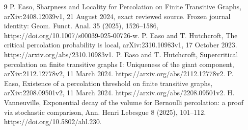 \documentclass[10pt]{article}
\begin{document}
9 P. Easo, Sharpness and Locality for Percolation on Finite Transitive Graphs, arXiv:2408.12039v1, 21 August 2024, exact reviewed source. Frozen journal identity: Geom. Funct. Anal. 35 (2025), 1526–1586, https://doi.org/10.1007/s00039-025-00726-w. P. Easo and T. Hutchcroft, The critical percolation probability is local, arXiv:2310.10983v1, 17 October 2023. https://arxiv.org/abs/2310.10983v1. P. Easo and T. Hutchcroft, Supercritical percolation on finite transitive graphs I: Uniqueness of the giant component, arXiv:2112.12778v2, 11 March 2024. https://arxiv.org/abs/2112.12778v2. P. Easo, Existence of a percolation threshold on finite transitive graphs, arXiv:2208.09501v2, 11 March 2024. https://arxiv.org/abs/2208.09501v2. H. Vanneuville, Exponential decay of the volume for Bernoulli percolation: a proof via stochastic comparison, Ann. Henri Lebesgue 8 (2025), 101–112. https://doi.org/10.5802/ahl.230.\par
\end{document}
